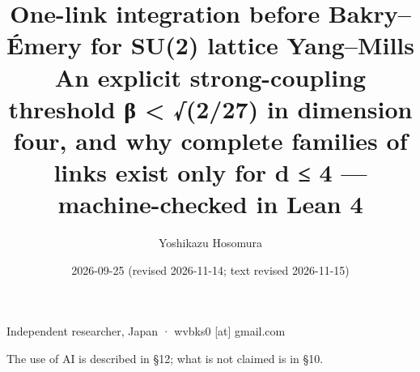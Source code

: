 \documentclass[11pt,a4paper]{article}
\theoremstyle{named}
\begin{document}
\title{One-link integration before Bakry–Émery for SU(2) lattice Yang–Mills\\[.5em]\large An explicit strong-coupling threshold β \textless{} √(2/27) in dimension four, and why complete families of links exist only for d ≤ 4 — machine-checked in Lean 4}
\author{Yoshikazu Hosomura}
\date{2026-09-25 (revised 2026-11-14; text revised 2026-11-15)}
\maketitle
\begin{center}\small Independent researcher, Japan · wvbks0 [at] gmail.com\end{center}
\begin{center}\small The use of AI is described in §12; what is not claimed is in §10.\end{center}
\end{document}
